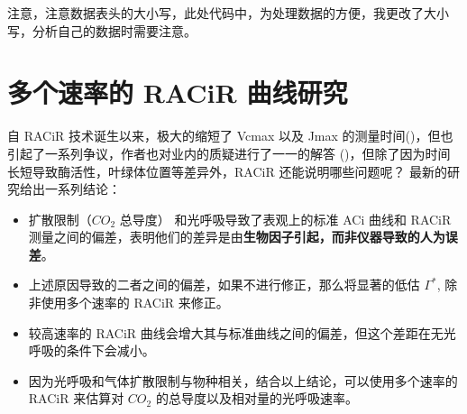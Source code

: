 \documentclass[
]{krantz}
\makeatletter
\newenvironment{Shaded}{\begin{snugshade}}{\end{snugshade}}
\newcommand{\AttributeTok}[1]{\textcolor[rgb]{0.77,0.63,0.00}{#1}}
\newcommand{\CommentTok}[1]{\textcolor[rgb]{0.56,0.35,0.01}{\textit{#1}}}
\newcommand{\FloatTok}[1]{\textcolor[rgb]{0.00,0.00,0.81}{#1}}
\newcommand{\FunctionTok}[1]{\textcolor[rgb]{0.00,0.00,0.00}{#1}}
\newcommand{\NormalTok}[1]{#1}
\newcommand{\OtherTok}[1]{\textcolor[rgb]{0.56,0.35,0.01}{#1}}
\newcommand{\SpecialCharTok}[1]{\textcolor[rgb]{0.00,0.00,0.00}{#1}}
\newcommand{\StringTok}[1]{\textcolor[rgb]{0.31,0.60,0.02}{#1}}
\newenvironment{kframe}{%
\medskip{}
\setlength{\fboxsep}{.8em}
 \def\at@end@of@kframe{}%
 \ifinner\ifhmode%
  \def\at@end@of@kframe{\end{minipage}}%
  \begin{minipage}{\columnwidth}%
 \fi\fi%
 \def\FrameCommand##1{\hskip\@totalleftmargin \hskip-\fboxsep
 \colorbox{shadecolor}{##1}\hskip-\fboxsep
     \hskip-\linewidth \hskip-\@totalleftmargin \hskip\columnwidth}%
 \MakeFramed {\advance\hsize-\width
   \@totalleftmargin\z@ \linewidth\hsize
   \@setminipage}}%
 {\par\unskip\endMakeFramed%
 \at@end@of@kframe}
\renewenvironment{Shaded}{\begin{kframe}}{\end{kframe}}
\makeatother
\begin{document}
\begin{Shaded}
\end{Shaded}

注意，注意数据表头的大小写，此处代码中，为处理数据的方便，我更改了大小写，分析自己的数据时需要注意。

\cleardoublepage

\hypertarget{multi1}{%
\section{多个速率的 RACiR 曲线研究}\label{multi1}}

自 RACiR 技术诞生以来，极大的缩短了 Vcmax 以及 Jmax 的测量时间(\citet{stinziano2017})，但也引起了一系列争议，作者也对业内的质疑进行了一一的解答 (\citet{stinziano2018})，但除了因为时间长短导致酶活性，叶绿体位置等差异外，RACiR 还能说明哪些问题呢？\citet{stinziano2019} 最新的研究给出一系列结论：

\begin{itemize}
\item
  扩散限制（\(CO_2\) 总导度） 和光呼吸导致了表观上的标准 ACi 曲线和 RACiR 测量之间的偏差，表明他们的差异是由\textbf{生物因子引起，而非仪器导致的人为误差}。
\item
  上述原因导致的二者之间的偏差，如果不进行修正，那么将显著的低估 \(\Gamma^*\), 除非使用多个速率的 RACiR 来修正。
\item
  较高速率的 RACiR 曲线会增大其与标准曲线之间的偏差，但这个差距在无光呼吸的条件下会减小。
\item
  因为光呼吸和气体扩散限制与物种相关，结合以上结论，可以使用多个速率的 RACiR 来估算对 \(CO_2\) 的总导度以及相对量的光呼吸速率。
\end{itemize}
\end{document}
